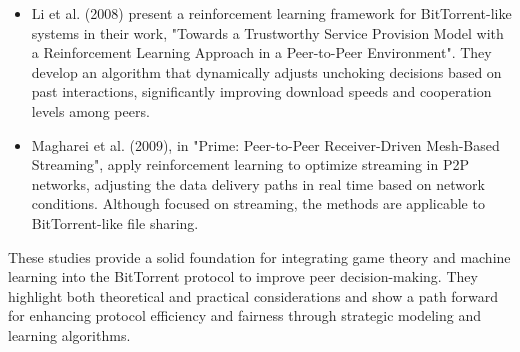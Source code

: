 \documentclass{article}
\begin{document}
\begin {itemize}
\item
Li et al. (2008) present a reinforcement learning framework for BitTorrent-like systems in their work, "Towards a Trustworthy Service Provision Model with a Reinforcement Learning Approach in a Peer-to-Peer Environment". They develop an algorithm that dynamically adjusts unchoking decisions based on past interactions, significantly improving download speeds and cooperation levels among peers.

\item
Magharei et al. (2009), in "Prime: Peer-to-Peer Receiver-Driven Mesh-Based Streaming", apply reinforcement learning to optimize streaming in P2P networks, adjusting the data delivery paths in real time based on network conditions. Although focused on streaming, the methods are applicable to BitTorrent-like file sharing.

\end {itemize}
These studies provide a solid foundation for integrating game theory and machine learning into the BitTorrent protocol to improve peer decision-making. They highlight both theoretical and practical considerations and show a path forward for enhancing protocol efficiency and fairness through strategic modeling and learning algorithms.
\end{document}
